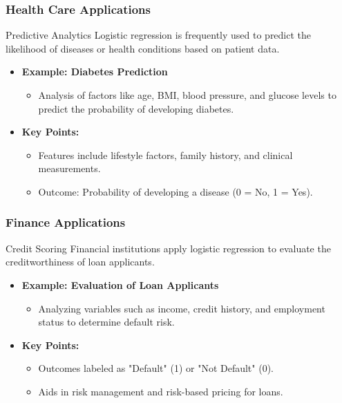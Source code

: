 \documentclass[aspectratio=169]{beamer}
\begin{document}
\begin{frame}[fragile]
    \frametitle{Health Care Applications}
    \begin{block}{Predictive Analytics}
        Logistic regression is frequently used to predict the likelihood of diseases or health conditions based on patient data.
    \end{block}

    \begin{itemize}
        \item \textbf{Example: Diabetes Prediction}
        \begin{itemize}
            \item Analysis of factors like age, BMI, blood pressure, and glucose levels to predict the probability of developing diabetes.
        \end{itemize}

        \item \textbf{Key Points:}
        \begin{itemize}
            \item Features include lifestyle factors, family history, and clinical measurements.
            \item Outcome: Probability of developing a disease (0 = No, 1 = Yes).
        \end{itemize}
    \end{itemize}
\end{frame}

\begin{frame}[fragile]
    \frametitle{Finance Applications}
    \begin{block}{Credit Scoring}
        Financial institutions apply logistic regression to evaluate the creditworthiness of loan applicants.
    \end{block}
    
    \begin{itemize}
        \item \textbf{Example: Evaluation of Loan Applicants}
        \begin{itemize}
            \item Analyzing variables such as income, credit history, and employment status to determine default risk.
        \end{itemize}

        \item \textbf{Key Points:}
        \begin{itemize}
            \item Outcomes labeled as "Default" (1) or "Not Default" (0).
            \item Aids in risk management and risk-based pricing for loans.
        \end{itemize}
    \end{itemize}
\end{frame}
\end{document}
